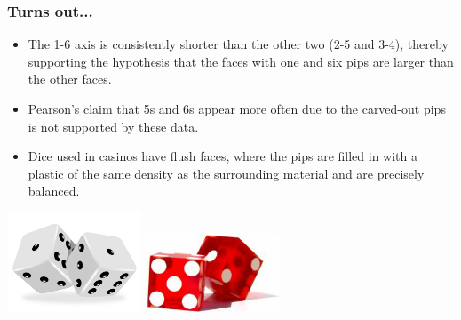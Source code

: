 \documentclass[notes,11pt, aspectratio=169]{beamer}
\begin{document}
\begin{frame}
\frametitle{Turns out...}

\begin{itemize}

\item The 1-6 axis is consistently shorter than the other two (2-5 and 3-4), thereby supporting the hypothesis that the faces with one and six pips are larger than the other faces.

\item Pearson's claim that 5s and 6s appear more often due to the carved-out pips is not supported by these data.

\item Dice used in casinos have flush faces, where the pips are filled in with a plastic of the same density as the surrounding material and are precisely balanced.

\end{itemize}

\begin{center}
\includegraphics[width=0.3\textwidth]{graphs/regular}
\includegraphics[width=0.3\textwidth]{graphs/casino}
\end{center}


\end{frame}

\end{document}

